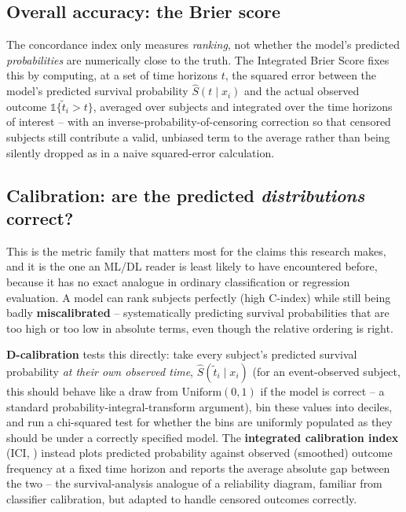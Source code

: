 \documentclass[11pt]{article}
\begin{document}
\subsection{Overall accuracy: the Brier score}

The concordance index only measures \emph{ranking}, not whether the
model's predicted \emph{probabilities} are numerically close to the
truth. The Integrated Brier Score \citep{graf1999ibs} fixes this by
computing, at a set of time horizons $t$, the squared error between the
model's predicted survival probability $\hat S(t \mid x_i)$ and the
actual observed outcome $\mathbb{1}\{\tilde t_i > t\}$, averaged over
subjects and integrated over the time horizons of interest -- with an
inverse-probability-of-censoring correction \citep{gerds2006} so that
censored subjects still contribute a valid, unbiased term to the
average rather than being silently dropped as in a naive squared-error
calculation.

\subsection{Calibration: are the predicted \emph{distributions} correct?}

This is the metric family that matters most for the claims this research
makes, and it is the one an ML/DL reader is least likely to have
encountered before, because it has no exact analogue in ordinary
classification or regression evaluation. A model can rank subjects
perfectly (high C-index) while still being badly \textbf{miscalibrated}
-- systematically predicting survival probabilities that are too high or
too low in absolute terms, even though the relative ordering is right.

\textbf{D-calibration} \citep{haider2020} tests this directly: take every
subject's predicted survival probability \emph{at their own observed
time}, $\hat S(\tilde t_i \mid x_i)$ (for an event-observed subject, this
should behave like a draw from $\mathrm{Uniform}(0,1)$ if the model is
correct -- a standard probability-integral-transform argument), bin these
values into deciles, and run a chi-squared test for whether the bins are
uniformly populated as they should be under a correctly specified model.
The \textbf{integrated calibration index} (ICI, \citealp{austin2020ici})
instead plots predicted probability against observed (smoothed) outcome
frequency at a fixed time horizon and reports the average absolute gap
between the two -- the survival-analysis analogue of a reliability
diagram, familiar from classifier calibration, but adapted to handle
censored outcomes correctly.
\end{document}
